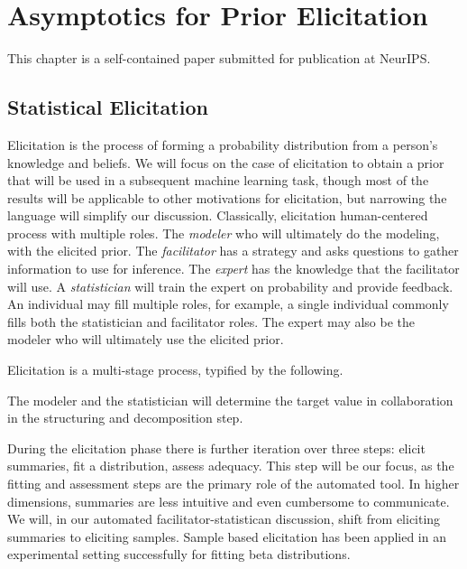 \chapter{Asymptotics for Prior Elicitation}

This chapter is a self-contained paper submitted for publication at NeurIPS.

\section{Statistical Elicitation}

Elicitation is the process of forming a probability distribution from a person's knowledge and beliefs. 
We will focus on the case of elicitation to obtain a prior that will be used in a subsequent machine learning task, though most of the results will be applicable to other motivations for elicitation, but narrowing the language will simplify our discussion. %
Classically, elicitation human-centered process with multiple roles.
The \emph{modeler} who will ultimately do the modeling, with the elicited prior. 
The \emph{facilitator} has a strategy and asks questions to gather information to use for inference.  
The \emph{expert} has the knowledge that the facilitator will use. 
A \emph{statistician} will train the expert on probability and provide feedback. 
An individual may fill multiple roles, for example, a single individual commonly fills both the statistician and facilitator roles.  
The expert may also be the modeler who will ultimately use the elicited prior.

Elicitation is a multi-stage process, typified by the following.

The modeler and the statistician will determine the target value in collaboration in the structuring and decomposition step. 



During the elicitation phase there is further iteration over three steps: elicit summaries, fit a distribution, assess adequacy. 
This step will be our focus, as the fitting and assessment steps are the primary role of the automated tool. 
In higher dimensions, summaries are less intuitive and even cumbersome to communicate.
We will, in our automated facilitator-statistican discussion, shift from eliciting summaries to eliciting samples. 
Sample based elicitation has been applied in an experimental setting successfully for fitting beta distributions.



